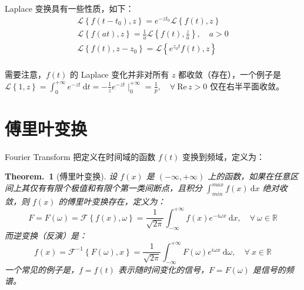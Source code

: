 \documentclass[UTF8]{report}
\def\Re{\mathrm{Re\,}}
\def\R{\mathbb{R}}
\theoremstyle{MyLineTheoremStyle} %
\theoremstyle{MyBlockTheoremStyle} %
\newtheorem{BlockTheorem}[LineTheorem]{Theorem.\,} %
\theoremstyle{MySubsubsectionStyle} %
\begin{document}
Laplace 变换具有一些性质，如下：
\begin{gather}
\mathscr{L}\left\{ f(t - t_0), z \right\} = e^{-zt_0} \mathscr{L}\left\{ f(t), z \right\} \\ 
\mathscr{L}\left\{ f(at), z \right\} = \frac{1}{a} \mathscr{L}\left\{ f(t), \frac{z}{a} \right\},\quad a > 0 \\
\mathscr{L}\left\{ f(t), z - z_0 \right\} = \mathscr{L}\left\{ e^{z_0 t} f(t), z \right\} \\
\end{gather}

需要注意，$f(t)$ 的 Laplace 变化并非对所有 $z$ 都收敛（存在），一个例子是 $ \mathscr{L}\left\{ 1, z \right\} = \int_{0}^{+\infty} e^{-zt} \ \mathrm{d}t = - \frac{1}{z} e^{-zt}\mid_0^{+\infty} = \frac{1}{p},\quad \forall\ \Re z > 0$ 仅在右半平面收敛。

\section{傅里叶变换}

Fourier Transform 把定义在时间域的函数 $f(t)$ 变换到频域，定义为：
\begin{BlockTheorem}[傅里叶变换]\label{傅里叶变换}
    设 $f(x)$ 是 $(-\infty, +\infty)$ 上的函数，如果在任意区间上其仅有有限个极值和有限个第一类间断点，且积分 $\int_{min}^{max} f(x) \ \mathrm{d}x$ 绝对收敛，则 $f(x)$ 的傅里叶变换存在，定义为：
    \begin{equation}
        F = F(\omega) = \mathscr{F}\left\{ f(x), \omega \right\} = \frac{1}{\sqrt{2\pi}} \int_{-\infty}^{+\infty} f(x)e^{-i\omega x} \ \mathrm{d}x,\quad \forall\ \omega \in \R
    \end{equation}
    而逆变换（反演）是：
\begin{equation}
    f(x) = \mathscr{F}^{-1}\left\{ F(\omega), x \right\} = \frac{1}{\sqrt{2\pi}} \int_{-\infty}^{+\infty} F(\omega)e^{i\omega x} \ \mathrm{d}\omega,\quad \forall\ x \in \R
\end{equation}
一个常见的例子是，$f = f(t)$ 表示随时间变化的信号，$F = F(\omega)$ 是信号的频谱。
\end{BlockTheorem}
\end{document}
